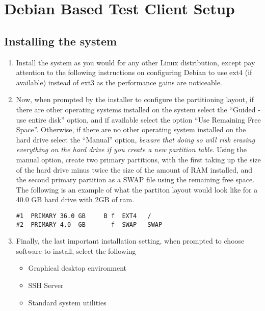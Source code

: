 \section{Debian Based Test Client Setup}
\subsection{Installing the system}
\label{sec:debianinstall}
\flushleft
\begin{enumerate}
\item 	Install the system as you would for any other Linux distribution, except pay attention to the following instructions on
		configuring Debian to use ext4 (if available) instead of ext3 as the performance gains are noticeable.


\item	Now, when prompted by the installer to configure the partitioning layout, if there are other operating systems installed on the 
		system select the ``Guided - use entire disk'' option, and if available select the option ``Use Remaining Free Space''. 
		Otherwise, if there are no other operating system installed on the hard drive select the ``Manual'' option, \emph{beware that 
		doing so will risk erasing everything on the hard drive if you create a new partition table}. Using the manual option, create 
		two primary partitions, with the first taking up the size of the hard drive minus twice the size of the amount of RAM installed, 
		and the second primary partition as a SWAP file using the remaining free space. The following is an example of what the partiton 
		layout would look like for a 40.0 GB hard drive with 2GB of ram.

\lstset{language=bash,caption=Manual Partition Layout Example}
\begin{lstlisting}
#1	PRIMARY	36.0 GB		B f	 EXT4	/
#2	PRIMARY	4.0  GB		  f	 SWAP	SWAP
\end{lstlisting}

\item 	Finally, the last important installation setting, when prompted to choose software to install, select the following
\begin{itemize}
\item 	Graphical desktop environment
\item 	SSH Server
\item	Standard system utilities
\end{itemize}
\end{enumerate}


\newpage
